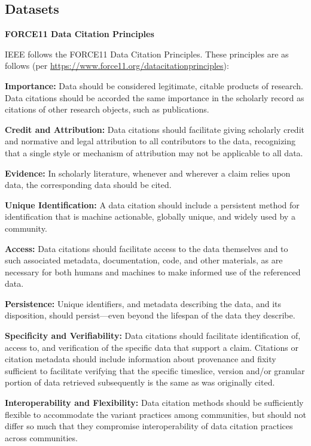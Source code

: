 \documentclass[10pt]{article}
\begin{document}
\subsection{Datasets}

\textbf{FORCE11 Data Citation Principles}

IEEE follows the FORCE11 Data Citation Principles. These principles are as follows (per \url{https://www.force11.org/datacitationprinciples}):

\begin{guidenumbers}
  \item \textbf{Importance:} Data should be considered legitimate, citable products of research. Data citations should be accorded the same importance in the scholarly record as citations of other research objects, such as publications.
  \item \textbf{Credit and Attribution:} Data citations should facilitate giving scholarly credit and normative and legal attribution to all contributors to the data, recognizing that a single style or mechanism of attribution may not be applicable to all data.
  \item \textbf{Evidence:} In scholarly literature, whenever and wherever a claim relies upon data, the corresponding data should be cited.
  \item \textbf{Unique Identification:} A data citation should include a persistent method for identification that is machine actionable, globally unique, and widely used by a community.
  \item \textbf{Access:} Data citations should facilitate access to the data themselves and to such associated metadata, documentation, code, and other materials, as are necessary for both humans and machines to make informed use of the referenced data.
  \item \textbf{Persistence:} Unique identifiers, and metadata describing the data, and its disposition, should persist—even beyond the lifespan of the data they describe.
  \item \textbf{Specificity and Verifiability:} Data citations should facilitate identification of, access to, and verification of the specific data that support a claim. Citations or citation metadata should include information about provenance and fixity sufficient to facilitate verifying that the specific timeslice, version and/or granular portion of data retrieved subsequently is the same as was originally cited.
  \item \textbf{Interoperability and Flexibility:} Data citation methods should be sufficiently flexible to accommodate the variant practices among communities, but should not differ so much that they compromise interoperability of data citation practices across communities.
\end{guidenumbers}
\end{document}
